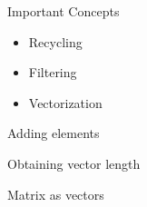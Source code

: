 \documentclass[xcolor=x11names]{beamer}
\renewcommand{\(}{\begin{columns}}
\renewcommand{\)}{\end{columns}}
\newcommand{\<}[1]{\begin{column}{#1}}
\renewcommand{\>}{\end{column}}
\begin{document}


\begin{frame}{Important Concepts}
	\begin{itemize}
		\item Recycling
		\item Filtering
		\item Vectorization
	\end{itemize}


\end{frame}


\begin{frame}{Adding elements}
	
\end{frame}


\begin{frame}{Obtaining vector length}
	
\end{frame}

\begin{frame}{Matrix as vectors}
	
\end{frame}
\end{document}
